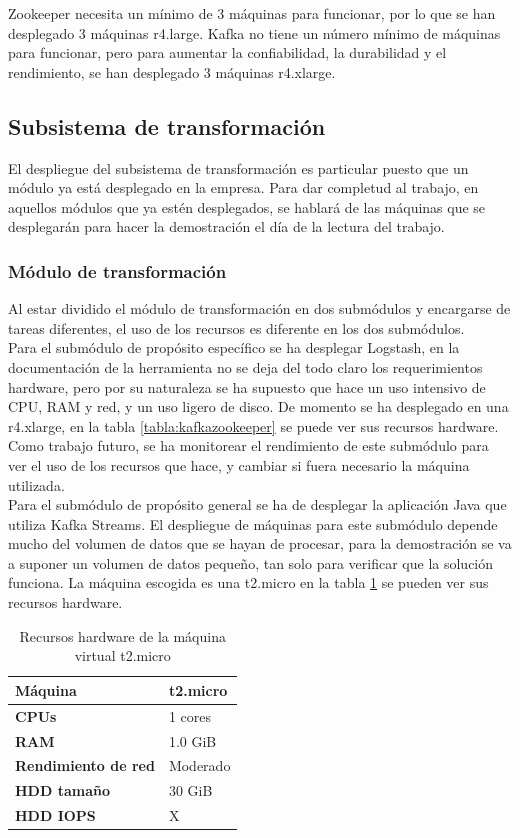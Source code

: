 Zookeeper necesita un mínimo de 3 máquinas para funcionar, por lo que se han desplegado 3 máquinas r4.large.
Kafka no tiene un número mínimo de máquinas para funcionar, pero para aumentar la confiabilidad, la durabilidad y el rendimiento, se han desplegado 3 máquinas r4.xlarge.

\subsection{Subsistema de transformación}
El despliegue del subsistema de transformación es particular puesto que un módulo ya está desplegado en la empresa. Para dar completud al trabajo, en aquellos módulos que ya estén desplegados, se hablará de las máquinas que se desplegarán para hacer la demostración el día de la lectura del trabajo.

\subsubsection{Módulo de transformación}
Al estar dividido el módulo de transformación en dos submódulos y encargarse de tareas diferentes, el uso de los recursos es diferente en los dos submódulos. 
\\
Para el submódulo de propósito específico se ha desplegar Logstash, en la documentación de la herramienta no se deja del todo claro los requerimientos hardware, pero por su naturaleza se ha supuesto que hace un uso intensivo de CPU, RAM y red, y un uso ligero de disco. De momento se ha desplegado en una r4.xlarge, en la tabla \ref{tabla:kafkazookeeper} se puede ver sus recursos hardware. Como trabajo futuro, se ha monitorear el rendimiento de este submódulo para ver el uso de los recursos que hace, y cambiar si fuera necesario la máquina utilizada.
\\
Para el submódulo de propósito general se ha de desplegar la aplicación Java que utiliza Kafka Streams. El despliegue de máquinas para este submódulo depende mucho del volumen de datos que se hayan de procesar, para la demostración se va a suponer un volumen de datos pequeño, tan solo para verificar que la solución funciona. La máquina escogida es una t2.micro en la tabla \ref{tabla:t2.micro} se pueden ver sus recursos hardware.

\begin{table}[H]\label{tabla:t2.micro}
	\centering
	\begin{tabular}{|l|l|}
		\hline
		\textbf{Máquina}            & \textbf{t2.micro}      \\ \hline
		\textbf{CPUs}               & 1 cores                \\ \hline
		\textbf{RAM}                & 1.0 GiB                \\ \hline
		\textbf{Rendimiento de red} & Moderado               \\ \hline
		\textbf{HDD tamaño}         & 30 GiB                 \\ \hline
		\textbf{HDD IOPS}           & X                      \\ \hline
	\end{tabular}
	\caption{Recursos hardware de la máquina virtual t2.micro}
\end{table}

